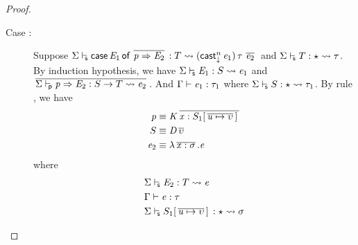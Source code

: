 \begin{proof}
\begin{description}
        \item[Case :] Suppose $ \Sigma  \vdash_{\!\!\mathsf{s} }  \mathsf{case} \, \mathit{E_{{\mathrm{1}}}} \, \mathsf{of} \, \,\overline{  \mathit{p}  \Rightarrow  \mathit{E_{{\mathrm{2}}}}  }\,  :  T   \rightsquigarrow   (  \mathsf{cast}_{\downarrow}^n \, \mathit{e_{{\mathrm{1}}}}  ) \, \tau \, \,\overline{  \mathit{e_{{\mathrm{2}}}}  }\, $ and $ \Sigma  \vdash_{\!\!\mathsf{s} }  T  :  \star   \rightsquigarrow   \tau $. By induction hypothesis, we have $ \Sigma  \vdash_{\!\!\mathsf{s} }  \mathit{E_{{\mathrm{1}}}}  :  S   \rightsquigarrow   \mathit{e_{{\mathrm{1}}}} $ and $\,\overline{   \Sigma  \vdash_{\!\!\mathsf{p} }  \mathit{p}   \Rightarrow   \mathit{E_{{\mathrm{2}}}}  :  S   \rightarrow   T   \rightsquigarrow   \mathit{e_{{\mathrm{2}}}}   }\,$. And $\Gamma  \vdash  \mathit{e_{{\mathrm{1}}}}  :  \tau_{{\mathrm{1}}}$ where $ \Sigma  \vdash_{\!\!\mathsf{s} }  S  :  \star   \rightsquigarrow   \tau_{{\mathrm{1}}} $. By rule , we have
        \begin{align*}
            \mathit{p} & \equiv  \mathit{K}  \,\overline{  \mathit{x}  :  S_{{\mathrm{1}}}  [  \,\overline{  \mathit{u}  \mapsto  \upsilon  }\,  ] \,  }\, \\
            S & \equiv  \mathit{D}    \,\overline{  \upsilon  }\, \\
            \mathit{e_{{\mathrm{2}}}} & \equiv  \lambda  \,\overline{  \mathit{x}  :  \sigma  }\,  .  \mathit{e}
        \end{align*}
        where
        \begin{align*}
            & \Sigma  \vdash_{\!\!\mathsf{s} }  \mathit{E_{{\mathrm{2}}}}  :  T   \rightsquigarrow   \mathit{e}  \\
            &\Gamma  \vdash  \mathit{e}  :  \tau \\
            & \Sigma  \vdash_{\!\!\mathsf{s} }  S_{{\mathrm{1}}}  [  \,\overline{  \mathit{u}  \mapsto  \upsilon  }\,  ] \,  :  \star   \rightsquigarrow   \sigma 
        \end{align*}

\end{description}
\end{proof}
